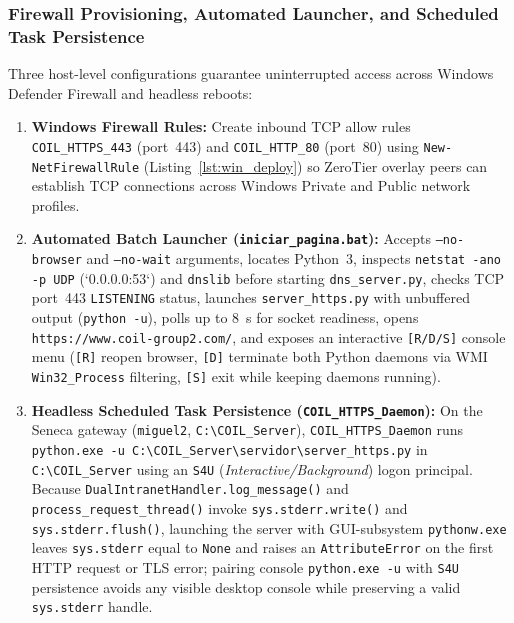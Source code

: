 \subsubsection{Firewall Provisioning, Automated Launcher, and Scheduled Task Persistence}
Three host-level configurations guarantee uninterrupted access across Windows Defender Firewall and headless reboots:
\begin{enumerate}
    \item \textbf{Windows Firewall Rules:} Create inbound TCP allow rules \texttt{COIL\_HTTPS\_443} (port~443) and \texttt{COIL\_HTTP\_80} (port~80) using \texttt{New-NetFirewallRule} (Listing~\ref{lst:win_deploy}) so ZeroTier overlay peers can establish TCP connections across Windows Private and Public network profiles.
    \item \textbf{Automated Batch Launcher (\texttt{iniciar\_pagina.bat}):} Accepts \texttt{--no-browser} and \texttt{--no-wait} arguments, locates Python~3, inspects \texttt{netstat -ano -p UDP} (`0.0.0.0:53`) and \texttt{dnslib} before starting \nolinkurl{dns_server.py}, checks TCP port~443 \texttt{LISTENING} status, launches \nolinkurl{server_https.py} with unbuffered output (\texttt{python -u}), polls up to \qty{8}{\second} for socket readiness, opens \nolinkurl{https://www.coil-group2.com/}, and exposes an interactive \texttt{[R/D/S]} console menu (\texttt{[R]} reopen browser, \texttt{[D]} terminate both Python daemons via WMI \texttt{Win32\_Process} filtering, \texttt{[S]} exit while keeping daemons running).
    \item \textbf{Headless Scheduled Task Persistence (\texttt{COIL\_HTTPS\_Daemon}):} On the Seneca gateway (\texttt{miguel2}, \texttt{C:\textbackslash{}COIL\_Server}), \texttt{COIL\_HTTPS\_Daemon} runs \texttt{python.exe -u C:\textbackslash{}COIL\_Server\textbackslash{}\allowbreak servidor\textbackslash{}server\_https.py} in \texttt{C:\textbackslash{}COIL\_Server} using an \texttt{S4U} (\textit{Interactive/Background}) logon principal. Because \texttt{DualIntranetHandler.log\_message()} and \texttt{process\_request\_thread()} invoke \texttt{sys.stderr.write()} and \texttt{sys.stderr.flush()}, launching the server with GUI-subsystem \texttt{pythonw.exe} leaves \texttt{sys.stderr} equal to \texttt{None} and raises an \texttt{AttributeError} on the first HTTP request or TLS error; pairing console \texttt{python.exe -u} with \texttt{S4U} persistence avoids any visible desktop console while preserving a valid \texttt{sys.stderr} handle.
\end{enumerate}

